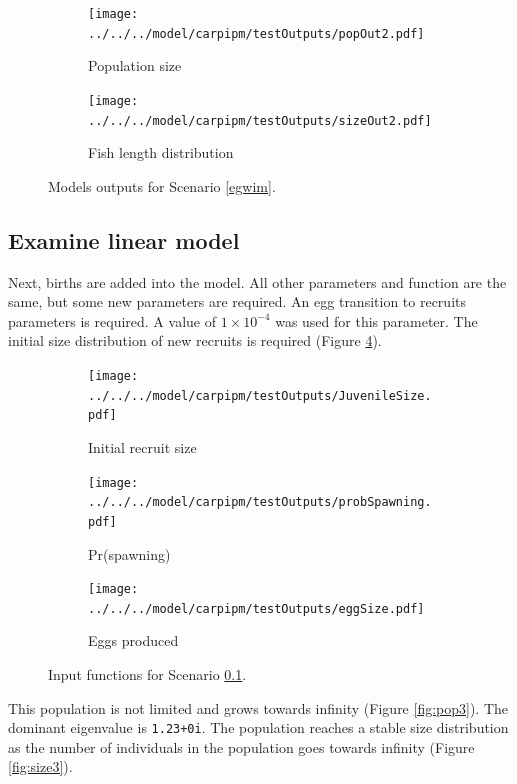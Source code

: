 \documentclass{article}[12pt]
\begin{document}
\begin{figure}[htbp]
	\centering
	\begin{subfigure}[b]{0.3\textwidth}
		\texttt{[image: ../../../model/carpipm/testOutputs/popOut2.pdf]} 
		\caption{Population size} 
		\label{fig:pop2}
	\end{subfigure}
	\qquad
	\begin{subfigure}[b]{0.3\textwidth}
		\texttt{[image: ../../../model/carpipm/testOutputs/sizeOut2.pdf]} 
		\caption{Fish length distribution} 
		\label{fig:size2}
	\end{subfigure}
   \caption{Models outputs for Scenario \ref{egwim}.}
   \label{fig:scn2out}
\end{figure}


\subsection{Examine linear model}\label{egwimb}


Next, births are added into the model. 
All other parameters and function are the same, but some new parameters are required. 
An egg transition to recruits parameters is required.
A value of \(1\times 10^{-4}\) was used for this parameter. 
The initial size distribution of new recruits is required (Figure \ref{fig:suv3}). 

\begin{figure}[htbp]
	\centering
	\begin{subfigure}[b]{0.45\textwidth}
		\texttt{[image: ../../../model/carpipm/testOutputs/JuvenileSize.pdf]} 
		\caption{Initial recruit size} 
		\label{fig:suv3}
	\end{subfigure}
	\qquad
	\begin{subfigure}[b]{0.45\textwidth}
		\texttt{[image: ../../../model/carpipm/testOutputs/probSpawning.pdf]} 
		\caption{Pr(spawning)} 
		\label{fig:grow3}
	\end{subfigure}
	\qquad
	\begin{subfigure}[b]{0.45\textwidth}
		\texttt{[image: ../../../model/carpipm/testOutputs/eggSize.pdf]} 
		\caption{Eggs produced } 
		\label{fig:ip3}
	\end{subfigure}
   \caption{Input functions for Scenario \ref{egwimb}.}
   \label{fig:scn3}
\end{figure}

This population is not limited and grows towards infinity (Figure \ref{fig:pop3}).
The dominant eigenvalue is \texttt{1.23+0i}.
The population reaches a stable size distribution as the number of individuals in the population goes towards infinity (Figure \ref{fig:size3}). 
\end{document}

